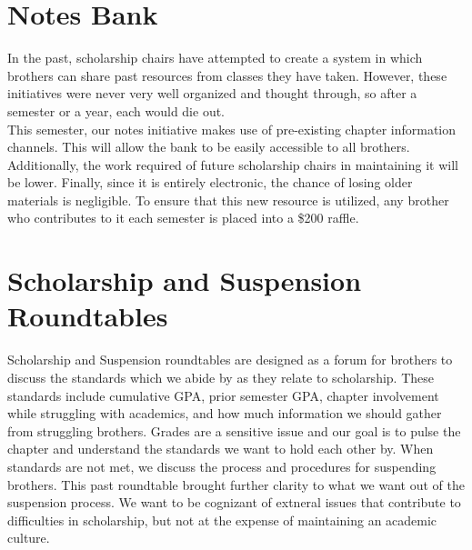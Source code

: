   \section*{Notes Bank}
    In the past, scholarship chairs have attempted to create a system in which brothers can share past resources from classes they have taken. However, these initiatives were never very well organized and thought through, so after a semester or a year, each would die out. \\

    This semester, our notes initiative makes use of pre-existing chapter information channels. This will allow the bank to be easily accessible to all brothers. Additionally, the work required of future scholarship chairs in maintaining it will be lower. Finally, since it is entirely electronic, the chance of losing older materials is negligible. To ensure that this new resource is utilized, any brother who contributes to it each semester is placed into a \$200 raffle.
    
  \section*{Scholarship and Suspension Roundtables}
    Scholarship and Suspension roundtables are designed as a forum for brothers to discuss the standards which we abide by as they relate to scholarship. These standards include cumulative GPA, prior semester GPA, chapter involvement while struggling with academics, and how much information we should gather from struggling brothers. Grades are a sensitive issue and our goal is to pulse the chapter  and understand the standards we want to hold each other by. When standards are not met, we discuss the process and procedures for suspending brothers. This past roundtable brought further clarity to what we want out of the suspension process. We want to be cognizant of extneral issues that contribute to difficulties in scholarship, but not at the expense of maintaining an academic culture.